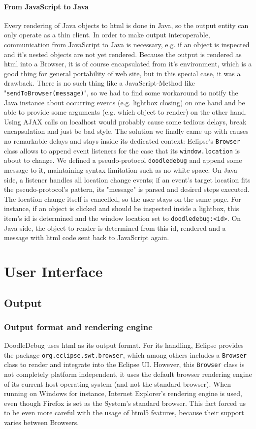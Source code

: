\documentclass[a4paper,ngerman,english]{amsbook} %
\begin{document}
\subsubsection*{From JavaScript to Java}
Every rendering of Java objects to html is done in Java, so the output entity can only operate as a thin client.
In order to make output interoperable, communication from JavaScript to Java is necessary, e.g. if an object is inspected and it's nested objects are not yet rendered. Because the output is rendered as html into a Browser, it is of course encapsulated from it's environment, which is a good thing for general portability of web site, but in this special case, it was a drawback. There is no such thing like a JavaScript-Method like "\verb.sendToBrowser(message).", so we had to find some workaround to notify the Java instance about occurring events (e.g. lightbox closing) on one hand and be able to provide some arguments (e.g. which object to render) on the other hand. Using AJAX calls on localhost would probably cause some tedious delays, break encapsulation and just be bad style. The solution we finally came up with causes no remarkable delays and stays inside its dedicated context: Eclipse's \verb.Browser. class allows to append event listeners for the case that its \verb-window.location- is about to change. We defined a pseudo-protocol \verb-doodledebug- and append some message to it, maintaining syntax limitation such as no white space. On Java side, a listener handles all location change events; if an event's target location fits the pseudo-protocol's pattern, its "message" is parsed and desired steps executed. The location change itself is cancelled, so the user stays on the same page. For instance, if an object is clicked and should be inspected inside a lightbox, this item's id is determined and the window location set to \verb-doodledebug:<id>-. On Java side, the object to render is determined from this id, rendered and a message with html code sent back to JavaScript again.

\chapter*{User Interface}
\section*{Output}
\subsection*{Output format and rendering engine}
DoodleDebug uses html as its output format. For its handling, Eclipse provides the package \verb-org.eclipse.swt.browser-, which among others includes a \verb.Browser. class to render and integrate into the Eclipse UI. However, this \verb.Browser. class is not completely platform independent, it uses the default browser rendering engine of its current host operating system (and not the standard browser). When running on Windows for instance, Internet Explorer's rendering engine is used, even though Firefox is set as the System's standard browser. This fact forced us to be even more careful with the usage of html5 features, because their support varies between Browsers.
\end{document}
